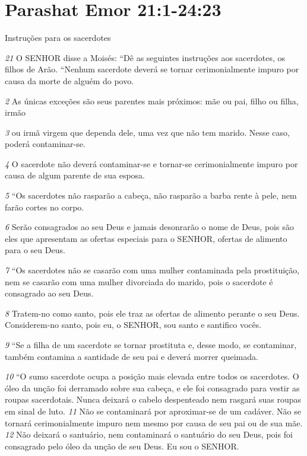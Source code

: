 \section*{Parashat Emor 21:1-24:23}

Instruções para os sacerdotes
   
\textit{\tiny 21}
 O SENHOR disse a Moisés: “Dê as seguintes instruções aos sacerdotes, os
filhos de Arão.
   “Nenhum sacerdote deverá se tornar cerimonialmente impuro por causa da
morte de alguém do povo.
 
\textit{\tiny 2} As únicas exceções são seus parentes mais próximos:
mãe ou pai, filho ou filha, irmão
 
\textit{\tiny 3} ou irmã virgem que dependa dele, uma vez que
não tem marido. Nesse caso, poderá contaminar-se.
 
\textit{\tiny 4} O sacerdote não deverá
contaminar-se e tornar-se cerimonialmente impuro por causa de algum parente
de sua esposa.
   
\textit{\tiny 5} “Os sacerdotes não rasparão a cabeça, não rasparão a barba rente à pele, nem
farão cortes no corpo.
 
\textit{\tiny 6} Serão consagrados ao seu Deus e jamais desonrarão o
nome de Deus, pois são eles que apresentam as ofertas especiais para o SENHOR,
ofertas de alimento para o seu Deus.
   
\textit{\tiny 7} “Os sacerdotes não se casarão com uma mulher contaminada pela
prostituição, nem se casarão com uma mulher divorciada do marido, pois o
sacerdote é consagrado ao seu Deus.
 
\textit{\tiny 8} Tratem-no como santo, pois ele traz as
ofertas de alimento perante o seu Deus. Considerem-no santo, pois eu, o SENHOR,
sou santo e santifico vocês.
   
\textit{\tiny 9} “Se a filha de um sacerdote se tornar prostituta e, desse modo, se contaminar,
também contamina a santidade de seu pai e deverá morrer queimada.
   
\textit{\tiny 10}
“O sumo sacerdote ocupa a posição mais elevada entre todos os sacerdotes. O
óleo da unção foi derramado sobre sua cabeça, e ele foi consagrado para vestir as
roupas sacerdotais. Nunca deixará o cabelo despenteado
 nem rasgará suas
roupas em sinal de luto. 
\textit{\tiny 11}
Não se contaminará por aproximar-se de um cadáver.
Não se tornará cerimonialmente impuro nem mesmo por causa de seu pai ou de
sua mãe. 
\textit{\tiny 12}
Não deixará o santuário, nem contaminará o santuário do seu Deus,
pois foi consagrado pelo óleo da unção de seu Deus. Eu sou o SENHOR.
   

